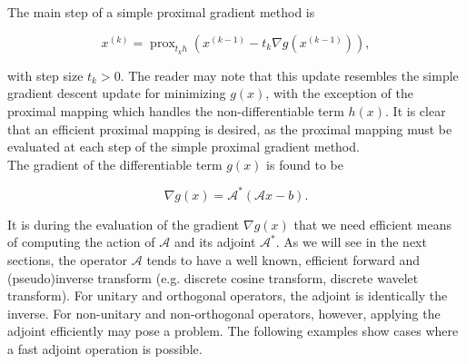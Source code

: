 \documentclass[journal]{IEEEtran}
\newcommand{\opn}[1]{\operatorname{#1}}
\begin{document}
\noindent The main step of a simple proximal gradient method is

\[ x^{(k)} = \opn{prox}_{t_k h}\left(x^{(k-1)} - t_k \nabla g(x^{(k-1)})\right), \] 

\noindent with step size $t_k>0$.  The reader may note that this update resembles the simple gradient descent update for minimizing $g(x)$, with the exception of the proximal mapping which handles the non-differentiable term $h(x)$.  It is clear that an efficient proximal mapping is desired, as the proximal mapping must be evaluated at each step of the simple proximal gradient method.\\

The gradient of the differentiable term $g(x)$ is found to be

\[ \nabla g(x) = \mathcal{A}^\ast(\mathcal{A}x-b). \] 

\noindent It is during the evaluation of the gradient $\nabla g(x)$ that we need efficient means of computing the action of $\mathcal{A}$ and its adjoint $\mathcal{A}^\ast$.  As we will see in the next sections, the operator $\mathcal{A}$ tends to have a well known, efficient forward and (pseudo)inverse transform (e.g. discrete cosine transform, discrete wavelet transform).  For unitary and orthogonal operators, the adjoint is identically the inverse.  For non-unitary and non-orthogonal operators, however, applying the adjoint efficiently may pose a problem.  The following examples show cases where a fast adjoint operation is possible.

\end{document}
